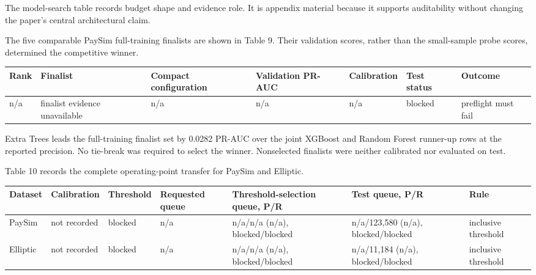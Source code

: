 \documentclass[11pt]{article}
\begin{document}
The model-search table records budget shape and evidence role. It is appendix material because it supports auditability without changing the paper's central architectural claim.

The five comparable PaySim full-training finalists are shown in Table 9. Their validation scores, rather than the small-sample probe scores, determined the competitive winner.

\begin{center}
\begin{minipage}{\linewidth}
\scriptsize
\setlength{\tabcolsep}{3pt}
\renewcommand{\arraystretch}{1.16}
\begin{tabularx}{\linewidth}{@{}>{\raggedright\arraybackslash}X >{\raggedright\arraybackslash}X >{\raggedright\arraybackslash}X >{\raggedright\arraybackslash}X >{\raggedright\arraybackslash}X >{\raggedright\arraybackslash}X >{\raggedright\arraybackslash}X@{}}
\toprule
Rank & Finalist & Compact configuration & Validation PR-AUC & Calibration & Test status & Outcome \\
\midrule
n/a & finalist evidence unavailable & n/a & n/a & n/a & blocked & preflight must fail \\
\bottomrule
\end{tabularx}
\end{minipage}
\end{center}


Extra Trees leads the full-training finalist set by 0.0282 PR-AUC over the joint XGBoost and Random Forest runner-up rows at the reported precision. No tie-break was required to select the winner. Nonselected finalists were neither calibrated nor evaluated on test.

Table 10 records the complete operating-point transfer for PaySim and Elliptic.

\begin{center}
\begin{minipage}{\linewidth}
\scriptsize
\setlength{\tabcolsep}{3pt}
\renewcommand{\arraystretch}{1.16}
\begin{tabularx}{\linewidth}{@{}>{\raggedright\arraybackslash}X >{\raggedright\arraybackslash}X >{\raggedright\arraybackslash}X >{\raggedright\arraybackslash}X >{\raggedright\arraybackslash}X >{\raggedright\arraybackslash}X >{\raggedright\arraybackslash}X@{}}
\toprule
Dataset & Calibration & Threshold & Requested queue & Threshold-selection queue, P/R & Test queue, P/R & Rule \\
\midrule
PaySim & not recorded & blocked & n/a & n/a/n/a (n/a), blocked/blocked & n/a/123,580 (n/a), blocked/blocked & inclusive threshold \\
Elliptic & not recorded & blocked & n/a & n/a/n/a (n/a), blocked/blocked & n/a/11,184 (n/a), blocked/blocked & inclusive threshold \\
\bottomrule
\end{tabularx}
\end{minipage}
\end{center}
\end{document}
